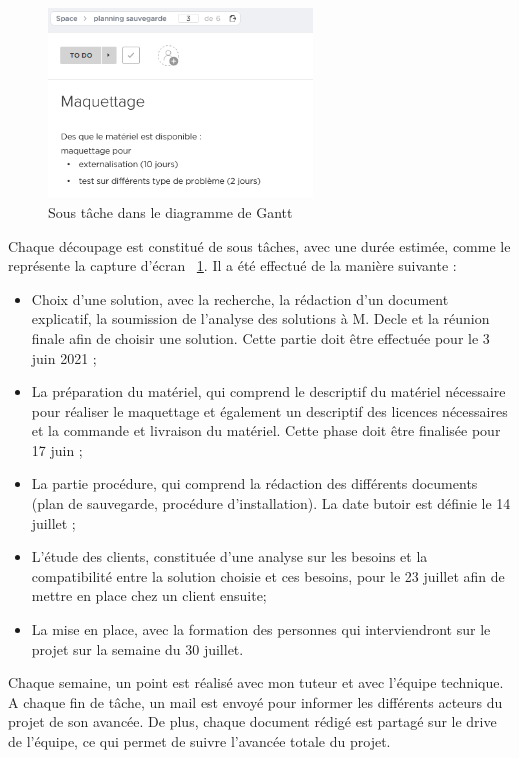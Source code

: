 \documentclass[pfe]{tnreport} %
\begin{document}
\begin{figure}[ht]
 \centering
 \includegraphics[width=7cm]{figures/ganttv2.png}
 \caption{Sous tâche dans le diagramme de Gantt}
 \label{fig:ganttcapt}
\end{figure}
\newpage
Chaque découpage est constitué de sous tâches, avec une durée estimée, comme le représente la capture d'écran ~\ref{fig:ganttcapt}. Il a été effectué de la manière suivante : \newline
\begin{itemize}
    \item Choix d'une solution, avec la recherche, la rédaction d'un document explicatif, la soumission de l'analyse des solutions à M. Decle et la réunion finale afin de choisir une solution. Cette partie doit être effectuée pour le 3 juin 2021 ; \newline
    \item La préparation du matériel, qui comprend le descriptif du matériel nécessaire pour réaliser le maquettage et également un descriptif des licences nécessaires et la commande et livraison du matériel. Cette phase doit être finalisée pour 17 juin ; \newline
    \item La partie procédure, qui comprend la rédaction des différents documents (plan de sauvegarde, procédure d'installation). La date butoir est définie le 14 juillet ; \newline
     \item L'étude des clients, constituée d'une analyse sur les besoins et la compatibilité entre la solution choisie et ces besoins, pour le 23 juillet afin de mettre en place chez un client ensuite; \newline
     \item La mise en place, avec la formation des personnes qui interviendront sur le projet sur la semaine du 30 juillet. \newline
\end{itemize}


Chaque semaine, un point est réalisé avec mon tuteur et avec l'équipe technique. \newline
A chaque fin de tâche, un mail est envoyé pour informer les différents acteurs du projet de son avancée. \newline
De plus, chaque document rédigé est partagé sur le drive de l'équipe, ce qui permet de suivre l'avancée totale du projet. \newline
\newpage
\end{document}
